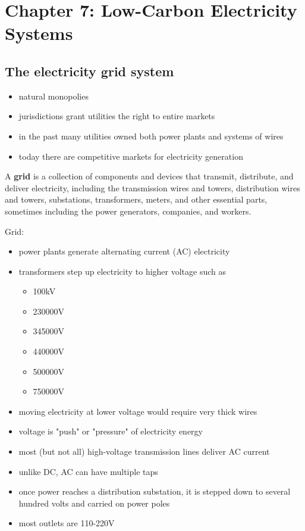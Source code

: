 \section{Chapter 7: Low-Carbon Electricity Systems}

\subsection{The electricity grid system}

\begin{itemize}
	\item natural monopolies
	\item jurisdictions grant utilities the right to entire markets
	\item in the past many utilities owned both power plants and systems of
	wires
	\item today there are competitive markets for electricity generation
\end{itemize}

A \textbf{grid} is a collection of components and devices that transmit,
distribute, and deliver electricity, including the transmission wires and
towers, distribution wires and towers, substations, transformers, meters, and
other essential parts, sometimes including the power generators, companies,
and workers.

Grid:
\begin{itemize}
	\item power plants generate alternating current (AC) electricity
	\item transformers step up electricity to higher voltage such as
	\begin{itemize}
		\item 100kV
		\item 230000V
		\item 345000V
		\item 440000V
		\item 500000V
		\item 750000V
	\end{itemize}
	\item moving electricity at lower voltage would require very thick
	wires
	\item voltage is "push" or "pressure" of electricity energy
	\item most (but not all) high-voltage transmission lines deliver
	AC current
	\item unlike DC, AC can have multiple taps
	\item once power reaches a distribution substation, it is stepped down
	to several hundred volts and carried on power poles
	\item most outlets are 110-220V
\end{itemize}

